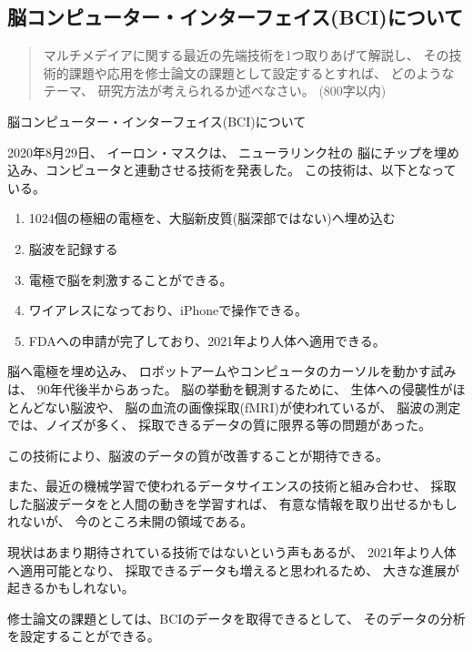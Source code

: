 \documentclass[12pt]{jsarticle}
\begin{document}
\subsection{
脳コンピューター・インターフェイス(BCI)について
}

\begin{quotation}
マルチメデイアに関する最近の先端技術を1つ取りあげて解説し、
その技術的課題や応用を修士論文の課題として設定するとすれば、
どのようなテーマ、
研究方法が考えられるか述べなさい。
(800字以内)
\end{quotation}

脳コンピューター・インターフェイス(BCI)について

2020年8月29日、
イーロン・マスクは、
ニューラリンク社の
脳にチップを埋め込み、コンピュータと連動させる技術を発表した。
この技術は、以下となっている。

\begin{enumerate}
\item 1024個の極細の電極を、大脳新皮質(脳深部ではない)へ埋め込む
\item 脳波を記録する
\item 電極で脳を刺激することができる。
\item ワイアレスになっており、iPhoneで操作できる。
\item FDAへの申請が完了しており、2021年より人体へ適用できる。
\end{enumerate}

脳へ電極を埋め込み、
ロボットアームやコンピュータのカーソルを動かす試みは、
90年代後半からあった。
脳の挙動を観測するために、
生体への侵襲性がほとんどない脳波や、
脳の血流の画像採取(fMRI)が使われているが、
脳波の測定では、ノイズが多く、
採取できるデータの質に限界る等の問題があった。

この技術により、脳波のデータの質が改善することが期待できる。

また、最近の機械学習で使われるデータサイエンスの技術と組み合わせ、
採取した脳波データをと人間の動きを学習すれば、
有意な情報を取り出せるかもしれないが、
今のところ未開の領域である。

現状はあまり期待されている技術ではないという声もあるが、
2021年より人体へ適用可能となり、
採取できるデータも増えると思われるため、
大きな進展が起きるかもしれない。

修士論文の課題としては、BCIのデータを取得できるとして、
そのデータの分析を設定することができる。
\end{document}
